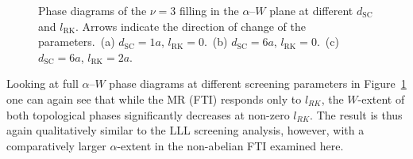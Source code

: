 \begin{figure}[htbp]
\caption{Phase diagrams of the $\nu = 3$ filling in the $\alpha$--$W$ plane at different $d_{\text{SC}}$ and $l_{\text{RK}}$. Arrows indicate the direction of change of the parameters.\ (a) $d_{\text{SC}} = 1a$, $l_{\text{RK}} = 0$.\ (b) $d_{\text{SC}} = 6a$, $l_{\text{RK}} = 0$.\ (c) $d_{\text{SC}} = 6a$, $l_{\text{RK}} = 2a$.}\label{fig:non_abelian_N12_screening_alpha_vs_W_phase_diagram_mindmap}
\end{figure}




Looking at full $\alpha$--$W$ phase diagrams at different screening parameters in Figure~\ref{fig:non_abelian_N12_screening_alpha_vs_W_phase_diagram_mindmap}  one can again see that while the MR (FTI) responds only to $l_{RK}$, the $W$-extent of both topological phases significantly decreases at non-zero $l_{RK}$. The result is thus again qualitatively similar to the LLL screening analysis, however, with a comparatively larger $\alpha$-extent in the non-abelian FTI examined here.

